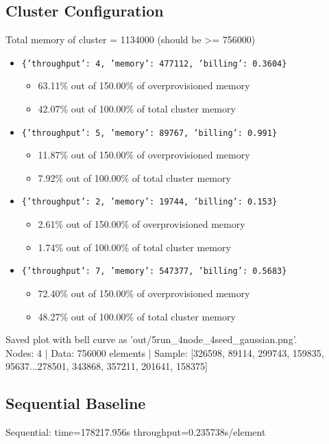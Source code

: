 \documentclass[]{interact}
\theoremstyle{plain}
\theoremstyle{definition}
\theoremstyle{remark}
\begin{document}
\subsection{Cluster Configuration}
Total memory of cluster = 1134000 (should be >= 756000)
\begin{itemize}
    \item \texttt{\{'throughput': 4, 'memory': 477112, 'billing': 0.3604\}}
    \begin{itemize}
        \item 63.11\% out of 150.00\% of overprovisioned memory
        \item 42.07\% out of 100.00\% of total cluster memory
    \end{itemize}
    \item \texttt{\{'throughput': 5, 'memory': 89767, 'billing': 0.991\}}
    \begin{itemize}
        \item 11.87\% out of 150.00\% of overprovisioned memory
        \item 7.92\% out of 100.00\% of total cluster memory
    \end{itemize}
    \item \texttt{\{'throughput': 2, 'memory': 19744, 'billing': 0.153\}}
    \begin{itemize}
        \item 2.61\% out of 150.00\% of overprovisioned memory
        \item 1.74\% out of 100.00\% of total cluster memory
    \end{itemize}
    \item \texttt{\{'throughput': 7, 'memory': 547377, 'billing': 0.5683\}}
    \begin{itemize}
        \item 72.40\% out of 150.00\% of overprovisioned memory
        \item 48.27\% out of 100.00\% of total cluster memory
    \end{itemize}
\end{itemize}
Saved plot with bell curve as 'out/5run\_4node\_4seed\_gaussian.png'.\\
Nodes: 4 | Data: 756000 elements | Sample: [326598, 89114, 299743, 159835, 95637...278501, 343868, 357211, 201641, 158375]

\subsection{Sequential Baseline}
Sequential: time=178217.956\textmu s throughput=0.235738\textmu s/element
\end{document}
